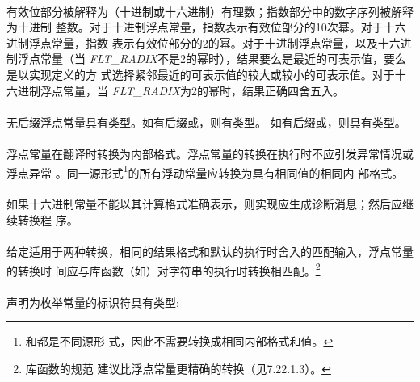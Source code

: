 \semantic
\paragraph{}
有效位部分被解释为（十进制或十六进制）有理数；指数部分中的数字序列被解释为十进制
整数。对于十进制浮点常量，指数表示有效位部分的10次幂。对于十六进制浮点常量，指数
表示有效位部分的2的幂。对于十进制浮点常量，以及十六进制浮点常量（当
\textit{FLT\_RADIX}不是2的幂时），结果要么是最近的可表示值，要么是以实现定义的方
式选择紧邻最近的可表示值的较大或较小的可表示值。对于十六进制浮点常量，当
\textit{FLT\_RADIX}为2的幂时，结果正确四舍五入。

\paragraph{}
无后缀浮点常量具有类型。如有后缀或，则有类型。
如有后缀或，则具有类型。

\paragraph{}
浮点常量在翻译时转换为内部格式。浮点常量的转换在执行时不应引发异常情况或浮点异常
。同一源形式\footnote{和都是不同源形
式，因此不需要转换成相同内部格式和值。}的所有浮动常量应转换为具有相同值的相同内
部格式。

\recprac
\paragraph{}
如果十六进制常量不能以其计算格式准确表示，则实现应生成诊断消息；然后应继续转换程
序。

\paragraph{}
给定适用于两种转换，相同的结果格式和默认的执行时舍入的匹配输入，浮点常量的转换时
间应与库函数（如）对字符串的执行时转换相匹配。\footnote{库函数的规范
建议比浮点常量更精确的转换（见7.22.1.3）。}

\syntax
\paragraph{}

\semantic
\paragraph{}
声明为枚举常量的标识符具有类型;

